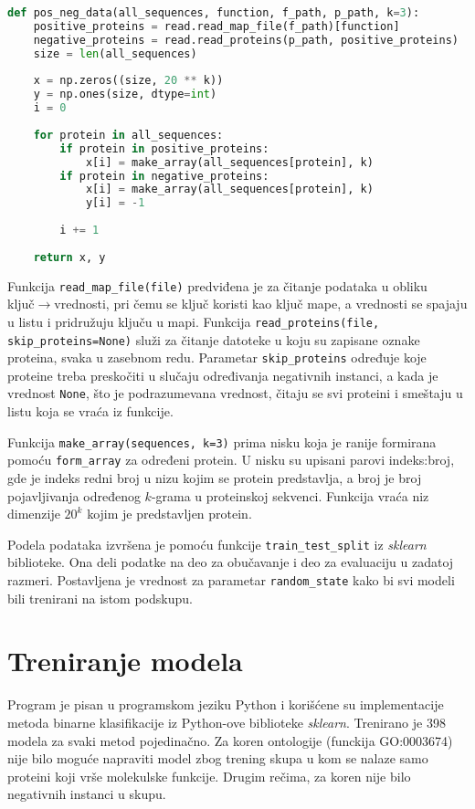 \begin{lstlisting}[language=Python]
def pos_neg_data(all_sequences, function, f_path, p_path, k=3):
	positive_proteins = read.read_map_file(f_path)[function]
	negative_proteins = read.read_proteins(p_path, positive_proteins)
	size = len(all_sequences)
	
	x = np.zeros((size, 20 ** k))
	y = np.ones(size, dtype=int)
	i = 0
	
	for protein in all_sequences:
		if protein in positive_proteins:
			x[i] = make_array(all_sequences[protein], k)
		if protein in negative_proteins:
			x[i] = make_array(all_sequences[protein], k)
			y[i] = -1
		
		i += 1
	
	return x, y
\end{lstlisting}

Funkcija \verb|read_map_file(file)| predviđena je za čitanje podataka u obliku \\ ključ$\rightarrow$vrednosti, pri čemu se ključ koristi kao ključ mape, a vrednosti se spajaju u listu i pridružuju ključu u mapi. Funkcija \verb|read_proteins(file, skip_proteins=None)| služi za čitanje datoteke u koju su zapisane oznake proteina, svaka u zasebnom redu. Parametar \verb|skip_proteins| određuje koje proteine treba preskočiti u slučaju određivanja negativnih instanci, a kada je vrednost \verb|None|, što je podrazumevana vrednost, čitaju se svi proteini i smeštaju u listu koja se vraća iz funkcije.


Funkcija \verb|make_array(sequences, k=3)| prima nisku koja je ranije formirana pomoću \verb|form_array| za određeni protein. U nisku su upisani parovi indeks:broj, gde je indeks redni broj u nizu kojim se protein predstavlja, a broj je broj pojavljivanja određenog $k$-grama u proteinskoj sekvenci. Funkcija vraća niz dimenzije $20^k$ kojim je predstavljen protein.

Podela podataka izvršena je pomoću funkcije \verb|train_test_split| iz \textit{sklearn} biblioteke. Ona deli podatke na deo za obučavanje i deo za evaluaciju u zadatoj razmeri. Postavljena je vrednost za parametar \verb|random_state| kako bi svi modeli bili trenirani na istom podskupu.

\section{Treniranje modela}
\label{sec:train}


Program je pisan u programskom jeziku Python i korišćene su implementacije metoda binarne klasifikacije iz Python-ove biblioteke \textit{sklearn}. Trenirano je 398 modela za svaki metod pojedinačno. Za koren ontologije (funckija GO:0003674) nije bilo moguće napraviti model zbog trening skupa u kom se nalaze samo proteini koji vrše molekulske funkcije. Drugim rečima, za koren nije bilo negativnih instanci u skupu.

